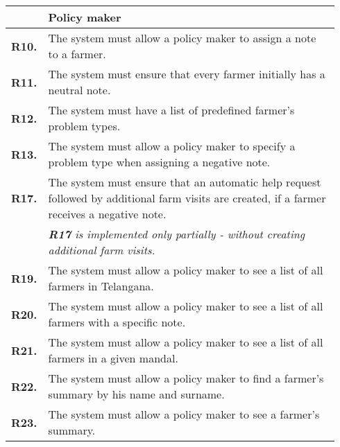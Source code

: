 \begin{longtable}{@{}p{0.06\linewidth} p{0.88\linewidth}}
	& \textbf{Policy maker} \\
    \midrule
	\textbf{R10.} & The system must allow a policy maker to assign a note to a farmer.\\
	\textbf{R11.} & The system must ensure that every farmer initially has a neutral note.\\
	\textbf{R12.} & The system must have a list of predefined farmer's problem types.\\
    \textbf{R13.} & The system must allow a policy maker to specify a problem type when assigning a negative note.\\
	\textbf{R17.} & The system must ensure that an automatic help request followed by additional farm visits are created, if a farmer receives a negative note.\\
	& \textit{\textbf{R17} is implemented only partially - without creating additional farm visits.}\\
	\textbf{R19.} & The system must allow a policy maker to see a list of all farmers in Telangana.\\
	\textbf{R20.} & The system must allow a policy maker to see a list of all farmers with a specific note.\\
	\textbf{R21.} & The system must allow a policy maker to see a list of all farmers in a given mandal.\\
	\textbf{R22.} & The system must allow a policy maker to find a farmer's summary by his name and surname.\\
	\textbf{R23.} & The system must allow a policy maker to see a farmer's summary.\\
	\midrule


\end{longtable}
